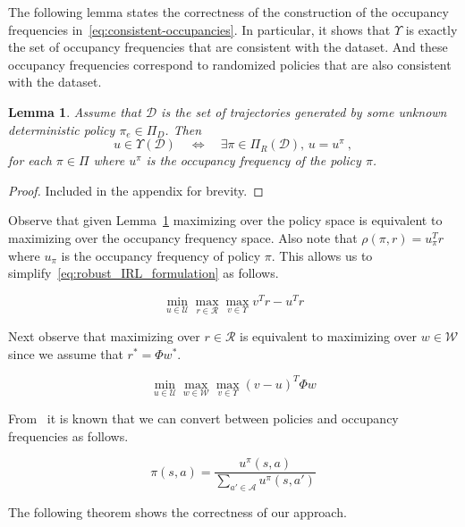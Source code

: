 \documentclass[11pt]{uai2023}
\newtheorem{lemma}{Lemma}
\begin{document}
The following lemma states the correctness of the construction of the occupancy frequencies in~\eqref{eq:consistent-occupancies}. In particular, it shows that $\Upsilon$ is exactly the set of occupancy frequencies that are consistent with the dataset. And these occupancy frequencies correspond to randomized policies that are also consistent with the dataset.

\begin{lemma}\label{lemma:occ_freq_matching}
	Assume that $\mathcal{D}$ is the set of trajectories generated by some unknown deterministic policy $\pi_e \in \Pi_D$. Then
	\[
		u \in \Upsilon(\mathcal{D})  \quad \Leftrightarrow \quad  \exists \pi \in \Pi_R(\mathcal{D}), \, u = u^{\pi}~,
	\]
	for each $\pi \in \Pi$ where $u^{\pi}$ is the occupancy frequency of the policy $\pi$.
\end{lemma}
\begin{proof}
	Included in the appendix for brevity.
\end{proof}

Observe that given Lemma~\ref{lemma:occ_freq_matching} maximizing over the policy space is equivalent to maximizing over the occupancy frequency space.
Also note that $\rho(\pi,r) = u_{\pi}^T r$ where $u_{\pi}$ is the occupancy frequency of policy $\pi$. This allows us to simplify~\eqref{eq:robust_IRL_formulation} as follows.

\begin{equation}
	\min_{u \in \mathcal{U}} \max_{r \in \mathcal{R}} \max_{v \in \Upsilon} v^T r - u^T r
\end{equation}

Next observe that maximizing over $r \in \mathcal{R}$ is equivalent to maximizing over $w \in \mathcal{W}$ since we assume that $r^* = \Phi w^*$.

\begin{equation}\label{eq:primal-robust-irl}
	\min_{u \in \mathcal{U}} \max_{w \in \mathcal{W}} \max_{v \in \Upsilon} (v - u)^T \Phi w
\end{equation}

From~\cite{Puterman1994} it is known that we can convert between policies and occupancy frequencies as follows.

\begin{equation}\label{eq:policy-construction}
	\pi(s, a) = \frac{u^{\pi}(s,a)}{\sum_{a' \in \mathcal{A}} u^{\pi}(s,a')}
\end{equation}

The following theorem shows the correctness of our approach.
\end{document}
